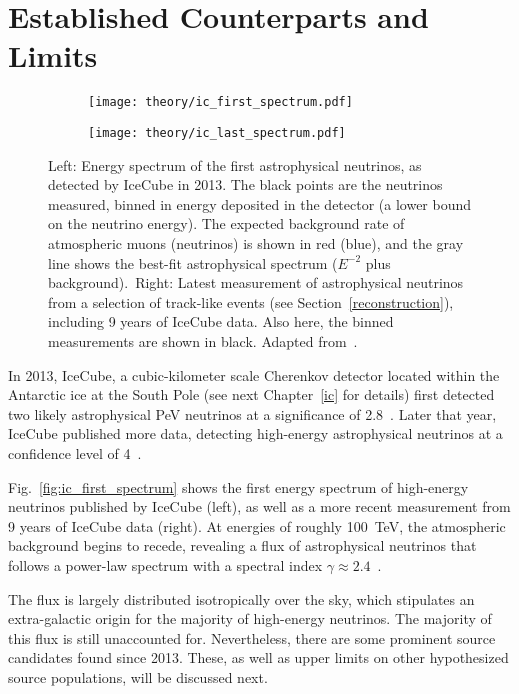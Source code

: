 \section{Established Counterparts and Limits}

\begin{figure}[htb]
    \centering
    \begin{subfigure}[b]{0.52\textwidth}
        \centering
        \texttt{[image: theory/ic\_first\_spectrum.pdf]}
    \end{subfigure}
    \begin{subfigure}[b]{0.47\textwidth}
        \centering
        \texttt{[image: theory/ic\_last\_spectrum.pdf]}
    \end{subfigure}
    \caption[Astrophysical neutrino spectrum]{Left: Energy spectrum of the first astrophysical neutrinos, as detected by IceCube in 2013. The black points are the neutrinos measured, binned in energy deposited in the detector (a lower bound on the neutrino energy). The expected background rate of atmospheric muons (neutrinos) is shown in red (blue), and the gray line shows the best-fit astrophysical spectrum ($E^{-2}$ plus background).\ Right: Latest measurement of astrophysical neutrinos from a selection of track-like events (see Section~\ref{reconstruction}), including 9 years of IceCube data. Also here, the binned measurements are shown in black. Adapted from~\cite{Aartsen2013,Abbasi2022b}.}
\end{figure}

In 2013, IceCube, a cubic-kilometer scale Cherenkov detector located within the Antarctic ice at the South Pole (see next Chapter~\ref{ic} for details) first detected two likely astrophysical \unit{\peta\eV} neutrinos at a significance of \SI{2.8}{\sigma}~. Later that year, IceCube published more data, detecting high-energy astrophysical neutrinos at a confidence level of \SI{4}{\sigma}~.

Fig.~\ref{fig:ic_first_spectrum} shows the first energy spectrum of high-energy neutrinos published by IceCube (left), as well as a more recent measurement from 9 years of IceCube data (right). At energies of roughly \SI{100}{\tera\eV}, the atmospheric background begins to recede, revealing a flux of astrophysical neutrinos that follows a power-law spectrum with a spectral index $\gamma\approx2.4$~.

The flux is largely distributed isotropically over the sky, which stipulates an extra-galactic origin for the majority of high-energy neutrinos. The majority of this flux is still unaccounted for. Nevertheless, there are some prominent source candidates found since 2013. These, as well as upper limits on other hypothesized source populations, will be discussed next.


